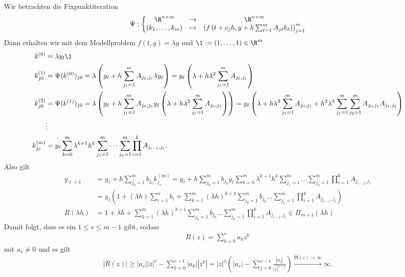 \begin{solution}
Wir betrachten die Fixpunktiteration
\begin{align*}
  \Psi: \bigg\{\begin{matrix}
    \R^{n \times m} & \rightarrow & \R^{n \times m} \\
    (k_1,\dots,k_m) & \mapsto & \left(f\left(t + c_jh,y + h\sum_{\ell = 1}^m A_{j\ell}k_{\ell}\right)\right)_{j=1}^m
  \end{matrix}
\end{align*}
Dann erhalten wir mit dem Modellproblem $f(t,y) = \lambda y$ und $\1 := (1,\dots,1) \in \R^m$
\begin{align*}
  k^{(0)} &= \lambda y_l \1 \\
  k^{(1)}_{j0} &= \Psi(k^{(0)})_{j0}
  = \lambda\left(y_{\ell} + h\sum_{j_1 = 1}^mA_{j_0,j_1}\lambda y_{\ell}\right)
  = y_{\ell}\left(\lambda + h\lambda^2\sum_{j_1 = 1}^mA_{j_0,j_1}\right) \\
  k^{(2)}_{j0} &= \Psi(k^{(1)})_{j0}
  = \lambda\left(y_{\ell} + h\sum_{j_1 = 1}^mA_{j_0,j_1}y_{\ell}\left(\lambda + h\lambda^2
  \sum_{j_1 = 1}^mA_{j_0,j_1}\right)\right)
  = y_{\ell}\left(\lambda + h\lambda^2\sum_{j_1 = 1}^mA_{j_0,j_1}
  + h^2\lambda^3\sum_{j_1 = 1}^m\sum_{j_2 = 1}^m A_{j_0,j_1}A_{j_1,j_2}\right) \\
  &\vdots \\
  k^{(m)}_{j_0} &= y_{\ell}\sum_{k = 0}^m \lambda^{k+1}h^k\sum_{j_1 = 1}^m\dots\sum_{j_{k} = 1}^m
  \prod_{i=1}^k A_{j_{i-1}, j_i}.
\end{align*}
Also gilt
\begin{align*}
  y_{\ell+1} &= y_\ell + h\sum_{j_0 = 1}^{m} b_{j_0}k_{j_o}^{(m)} =
  y_\ell + h\sum_{j_0 = 1}^{m} b_{j_0}y_{\ell}\sum_{k = 0}^m \lambda^{k+1}h^k\sum_{j_1 = 1}^m\dots\sum_{j_{k} = 1}^m
  \prod_{i=1}^k A_{j_{i-1}, j_i} \\
  &= y_{\ell}\left(1 + (\lambda h)\sum_{i=1}^nb_i + \sum_{k=1}^m(\lambda h)^{k+1}
  \sum_{j_0 = 1}^mb_{j_0}\dots\sum_{j_k = 1}^m \prod_{i=1}^k A_{j_{i-1},j_i}\right) \\
  R(\lambda h) &= 1 + \lambda h + \sum_{k=1}^m(\lambda h)^{k+1}
  \sum_{j_0 = 1}^mb_{j_0}\dots\sum_{j_k = 1}^m \prod_{i=1}^k A_{j_{i-1},j_i}
  \in \Pi_{m+1}(\lambda h)
\end{align*}
Damit folgt, dass es ein $1 \leq v \leq m - 1$ gibt, sodass
\begin{align*}
  R(z) = \sum_{k= 0}^v a_kz^k
\end{align*}
mit $a_v \neq 0$ und es gilt
\begin{align*}
  |R(z)| \geq |a_v||z|^v - \sum_{k=0}^{v-1}|a_k||z^k|
  = |z|^v\left(|a_v| - \sum_{j = 0}^{v - 1}\frac{|a_j|}{|z|^{v - j}}\right)
  \stackrel{\Re(z) \rightarrow \infty}{\longrightarrow} \infty.
\end{align*}
\end{solution}
